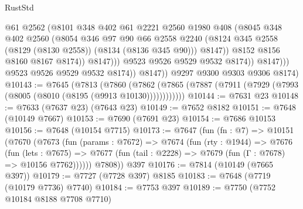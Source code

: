 \begin{lexlean}{RustStd}
\begin{coremodule}
{\begin{coremodule}
{{{{{{{{{{{{{{{{{{{{{{{{{{{{{{{{{{{{{{{{{{{{{{{{{{{{{                                @61
                                @2562
                                (@8101
                                  @348
                                  @402
                                  @61
                                  @2221
                                  @2560
                                  @1980
                                  @408
                                  (@8045
                                    @348
                                    @402
                                    @2560
                                    (@8054
                                      @346
                                      @97
                                      @90
                                      @66
                                      @2558
                                      @2240
                                      (@8124
                                        @345
                                        @2558
                                        (@8129 (@8130 @2558))
                                        (@8134 (@8136 @345 @90)))
                                      @8147))
                                  @8152
                                  @8156
                                  @8160
                                  @8167
                                  @8174))
                              @8147)))
                        @9523
                        @9526
                        @9529
                        @9532
                        @8174))
                    @8147)))
              @9523
              @9526
              @9529
              @9532
              @8174))
          @8147))
      @9297
      @9300
      @9303
      @9306
      @8174)
@10143 := @7645
    (@7813
      (@7860
        (@7862 (@7865 (@7887 (@7911 (@7929 (@7993 (@8005 (@8010 (@8195 (@9913 @10130))))))))))))
@10144 := @7631 @23
@10148 := @7633 (@7637 @23) (@7643 @23)
@10149 := @7652 @8182
@10151 := @7648 (@10149 @7667)
@10153 := @7690 (@7691 @23)
@10154 := @7686 @10153
@10156 := @7648 (@10154 @7715)
@10173 := @7647
    (fun (fn : @7) =>
    @10151
      (@7670
        (@7673
          (fun (params : @7672) =>
          @7674
            (fun (rty : @1944) =>
            @7676
              (fun (lets : @7675) =>
              @7677 (fun (tail : @2228) => @7679 (fun (Γ : @7678) => @10156 @7762))))))
        @7808))
    @397
@10176 := @7814 (@10149 (@7665 @397))
@10179 := @7727 (@7728 @397) @8185
@10183 := @7648 (@7719 (@10179 @7736) @7740)
@10184 := @7753 @397
@10189 := @7750 (@7752 @10184 @8188 @7708 @7710)
}}}}}}}}}}}}}}}}}}}}}}}}}}}}}}}}}}}}}}}}}}}}}}}}}}}}}
\end{coremodule}}
\end{coremodule}
\end{lexlean}
